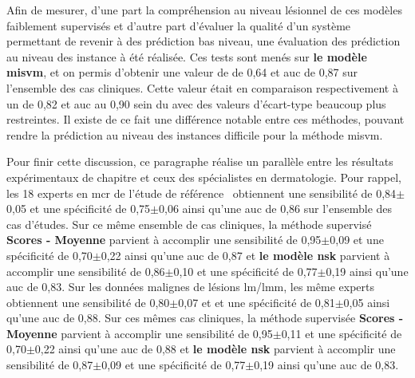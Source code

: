 Afin de mesurer, d'une part la compréhension au niveau lésionnel de ces modèles faiblement supervisés et d'autre part d'évaluer la qualité d'un système permettant de revenir à des prédiction bas niveau, une évaluation des prédiction au niveau des instance à été réalisée. Ces tests sont menés sur \textbf{le modèle \gls{misvm}}, et on permis d'obtenir une valeur de \fscore{} de 0,64 et \gls{auc} de 0,87 sur l'ensemble des cas cliniques. Cette valeur était en comparaison respectivement à un \fscore{} de 0,82 et \gls{auc} au 0,90 sein du  avec des valeurs d'écart-type beaucoup plus restreintes. Il existe de ce fait une différence notable entre ces méthodes, pouvant rendre la prédiction au niveau des instances difficile pour la méthode \gls{misvm}.\par

Pour finir cette discussion, ce paragraphe réalise un parallèle entre les résultats expérimentaux de chapitre et ceux des spécialistes en dermatologie. Pour rappel, les 18 experts en \gls{mcr} de l’étude de référence~\cite{Cinotti2016} obtiennent une sensibilité de 0,84$\pm$0,05 et une spécificité de 0,75$\pm$0,06 ainsi qu'une \gls{auc} de 0,86 sur l'ensemble des cas d'études. Sur ce même ensemble de cas cliniques, la méthode supervisé \textbf{Scores - Moyenne} parvient à accomplir une sensibilité de 0,95$\pm$0,09 et une spécificité de 0,70$\pm$0,22 ainsi qu'une \gls{auc} de 0,87 et \textbf{le modèle \gls{nsk}} parvient à accomplir une sensibilité de 0,86$\pm$0,10 et une spécificité de 0,77$\pm$0,19 ainsi qu'une \gls{auc} de 0,83. Sur les données malignes de lésions \gls{lm}/\gls{lmm}, les même experts obtiennent une sensibilité de 0,80$\pm$0,07 et et une spécificité de 0,81$\pm$0,05 ainsi qu'une \gls{auc} de 0,88. Sur ces mêmes cas cliniques, la méthode supervisée \textbf{Scores - Moyenne} parvient à accomplir une sensibilité de 0,95$\pm$0,11 et une spécificité de 0,70$\pm$0,22 ainsi qu'une \gls{auc} de 0,88 et \textbf{le modèle \gls{nsk}} parvient à accomplir une sensibilité de 0,87$\pm$0,09 et une spécificité de 0,77$\pm$0,19 ainsi qu'une \gls{auc} de 0,83.\par